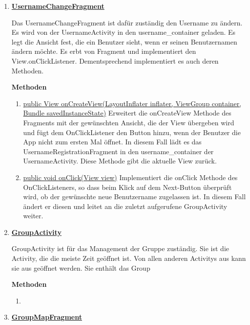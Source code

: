 \begin{enumerate}
	\item \textbf{\underline{UsernameChangeFragment}}
		
	Das UsernameChangeFragment ist dafür zuständig den Username zu ändern. Es wird von der UsernameActivity in den username\_container geladen. Es legt die Ansicht fest, die ein Benutzer sieht, wenn er seinen Benutzernamen ändern möchte. Es erbt von Fragment und implementiert den View.onClickListener. Dementsprechend implementiert es auch deren Methoden.
	
	\textbf{Methoden}
	
	\begin{enumerate}
		\item \underline{public View onCreateView(LayoutInflater inflater, ViewGroup container, Bundle savedInstanceState)}
		Erweitert die onCreateView Methode des Fragments mit der gewünschten Ansicht, die der View übergeben wird und fügt dem OnClickListener den Button hinzu, wenn der Benutzer die App nicht zum ersten Mal öffnet. In diesem Fall lädt es das UsernameRegistrationFragment in den username\_container der UsernameActivity. Diese Methode gibt die aktuelle View zurück.
		\item \underline{public void onClick(View view)}
		Implementiert die onClick Methode des OnClickListeners, so dass beim Klick auf dem Next-Button überprüft wird, ob der gewünschte neue Benutzername zugelassen ist. In diesem Fall ändert er diesen und leitet an die zuletzt aufgerufene GroupActivity weiter.
	\end{enumerate}
	
	\item \textbf{\underline{GroupActivity}}
	
	GroupActivity ist für das Management der Gruppe zuständig. Sie ist die Activity, die die meiste Zeit geöffnet ist. Von allen anderen Activitys aus kann sie aus geöffnet werden. Sie enthält das Group
	
	\textbf{Methoden}
	
	\begin{enumerate}
		\item \underline{}
		
	\end{enumerate}
	
	\item \textbf{\underline{GroupMapFragment}}
	

\end{enumerate}

